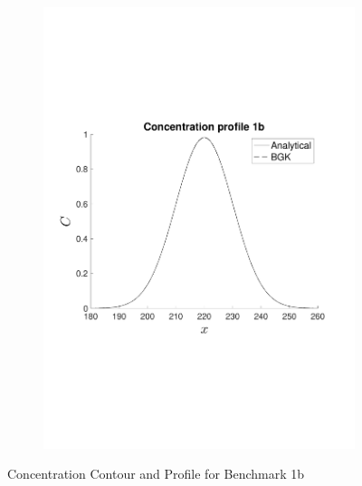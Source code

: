 \documentclass[11pt]{article}   	%
\begin{document}
\begin{figure}
\begin{subfigure}{0.5\textwidth}
  \includegraphics[width=1.2\linewidth]{concentration_profile_benchmark_1b}
\end{subfigure}
\caption{Concentration Contour and Profile for Benchmark 1b}
\label{fig:test}
\end{figure}
\end{document}
